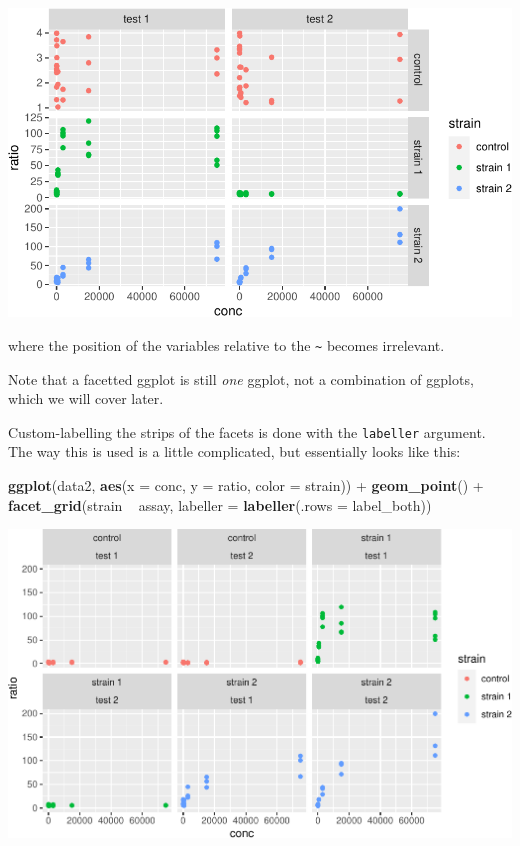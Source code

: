 \documentclass[]{book}
\newenvironment{Shaded}{}{}
\newcommand{\DataTypeTok}[1]{\textcolor[rgb]{0.56,0.13,0.00}{#1}}
\newcommand{\KeywordTok}[1]{\textcolor[rgb]{0.00,0.44,0.13}{\textbf{#1}}}
\newcommand{\NormalTok}[1]{#1}
\newcommand{\OperatorTok}[1]{\textcolor[rgb]{0.40,0.40,0.40}{#1}}
\newcommand{\StringTok}[1]{\textcolor[rgb]{0.25,0.44,0.63}{#1}}
\begin{document}
\begin{center}\includegraphics[width=\textwidth]{TRES-Tidy-Tutorial_files/figure-latex/unnamed-chunk-132-1} \end{center}

where the position of the variables relative to the \texttt{\textasciitilde{}} becomes irrelevant.

Note that a facetted ggplot is still \emph{one} ggplot, not a combination of ggplots, which we will cover later.

Custom-labelling the strips of the facets is done with the \texttt{labeller} argument. The way this is used is a little complicated, but essentially looks like this:

\begin{Shaded}
\begin{Highlighting}[]
\KeywordTok{ggplot}\NormalTok{(data2, }\KeywordTok{aes}\NormalTok{(}\DataTypeTok{x =}\NormalTok{ conc, }\DataTypeTok{y =}\NormalTok{ ratio, }\DataTypeTok{color =}\NormalTok{ strain)) }\OperatorTok{+}
\StringTok{  }\KeywordTok{geom_point}\NormalTok{() }\OperatorTok{+}
\StringTok{  }\KeywordTok{facet_grid}\NormalTok{(strain }\OperatorTok{~}\StringTok{ }\NormalTok{assay, }\DataTypeTok{labeller =} \KeywordTok{labeller}\NormalTok{(}\DataTypeTok{.rows =}\NormalTok{ label_both))}
\end{Highlighting}
\end{Shaded}

\begin{center}\includegraphics[width=\textwidth]{TRES-Tidy-Tutorial_files/figure-latex/unnamed-chunk-133-1} \end{center}
\end{document}
